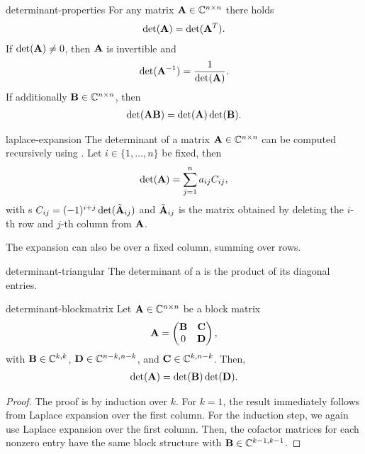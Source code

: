 \begin{Theorem}{determinant-properties}
  For any matrix $\mathbf A\in\mathbb C^{n\times n}$ there holds
  \begin{gather}
    \det(\mathbf A) = \det(\mathbf A^T).
  \end{gather}
  If $\det(\mathbf A)\neq 0$, then $\mathbf A$ is invertible and
  \begin{gather}
    \det(\mathbf A^{-1}) = \frac1{\det(\mathbf A)}.
  \end{gather}
  If additionally $\mathbf B\in\mathbb C^{n\times n}$, then
  \begin{gather}
    \det(\mathbf A\mathbf B) = \det(\mathbf A)\det(\mathbf B).
  \end{gather}
\end{Theorem}

\begin{Theorem}{laplace-expansion}
  The determinant of a matrix $\mathbf A\in\mathbb C^{n\times n}$ can be computed
  recursively using . Let
  $i\in\{1,\dots,n\}$ be fixed, then
  \begin{gather}
    \det(\mathbf A) = \sum_{j=1}^n a_{ij} C_{ij},
  \end{gather}
  with s $C_{ij}=(-1)^{i+j}\det(\tilde{\mathbf A}_{ij})$ and $\tilde{\mathbf A}_{ij}$ is the matrix obtained by deleting the $i$-th row and $j$-th column from $\mathbf A$.

  The expansion can also be over a fixed column, summing over rows.
\end{Theorem}

\begin{Corollary}{determinant-triangular}
  The determinant of a  is the product of its diagonal entries.
\end{Corollary}

\begin{Lemma}{determinant-blockmatrix}
  Let $\mathbf A\in\mathbb C^{n\times n}$ be a block matrix
  \begin{gather}
    \mathbf A =
    \begin{pmatrix}
      \mathbf B & \mathbf C\\ 0 & \mathbf D
    \end{pmatrix},
  \end{gather}
  with $\mathbf B\in\mathbb C^{k,k}$, $\mathbf D\in\mathbb C^{n-k,n-k}$, and $\mathbf C\in\mathbb C^{k,n-k}$. Then,
  \begin{gather}
    \det(\mathbf A) = \det(\mathbf B)\det(\mathbf D).
  \end{gather}
\end{Lemma}

\begin{proof}
  The proof is by induction over $k$. For $k=1$, the result
  immediately follows from Laplace expansion over the first
  column. For the induction step, we again use Laplace expansion over
  the first column. Then, the cofactor matrices for each nonzero entry
  have the same block structure with $\mathbf B\in\mathbb C^{k-1,k-1}$.
\end{proof}

